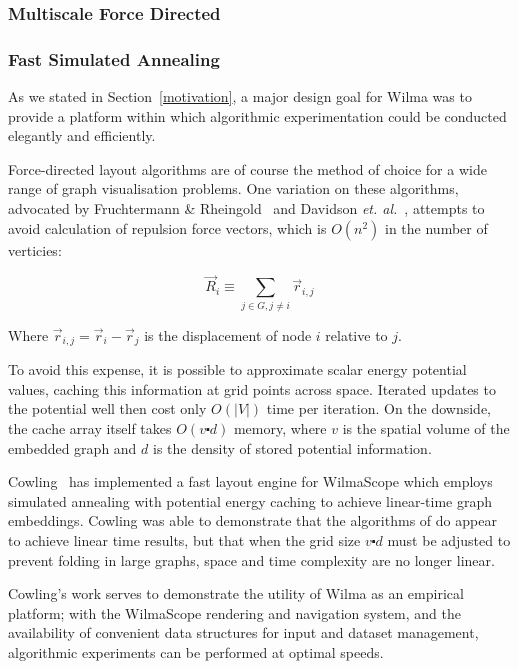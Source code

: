 \documentclass[runningheads]{cl2emult}
\begin{document}
\subsubsection{Multiscale Force Directed}

\subsubsection{Fast Simulated Annealing}

As we stated in Section~\ref{motivation}, a major design goal for Wilma
was to provide a platform within which algorithmic experimentation could be
conducted elegantly and efficiently.

Force-directed layout algorithms are of course the method of choice for a
wide range of graph visualisation problems.  One variation on these
algorithms, advocated by Fruchtermann \&
Rheingold~\cite{fruchtermann90force-directed} and Davidson {\em et.
al.}~\cite{davidson01noise}, attempts to avoid calculation of repulsion force
vectors, which is $O(n^2)$ in the number of verticies:  

\begin{equation}
\vec{R}_i \equiv \sum_{j \in G, j \neq i} \vec{r}_{i,j}
\end{equation}

\noindent Where $\vec{r}_{i,j} = \vec{r}_i - \vec{r}_j$ is the displacement
of node $i$ relative to $j$.

To avoid this expense, it is possible to approximate scalar energy potential
values, caching this information at grid points across space.  Iterated
updates to the potential well then cost only $O(|V|)$ time per iteration.  On
the downside, the cache array itself takes $O(v \centerdot d)$ memory, where
$v$ is the spatial volume of the embedded graph and $d$ is the density of
stored potential information.

Cowling~\cite{cowling02fast} has implemented a fast layout engine for
WilmaScope which employs simulated annealing with potential energy caching
to achieve linear-time graph embeddings.  Cowling was able to demonstrate
that the algorithms of \cite{davidson01noise} do appear to achieve linear
time results, but that when the grid size $v \centerdot d$ must be adjusted to
prevent folding in large graphs, space and time complexity are
no longer linear.

Cowling's work serves to demonstrate the utility of Wilma as an empirical
platform; with the WilmaScope rendering and navigation system, and the
availability of convenient data structures for input and dataset management,
algorithmic experiments can be performed at optimal speeds.
\end{document}
